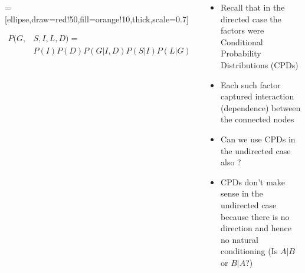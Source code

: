 \begin{frame}
\end{frame}

\begin{frame}
	\begin{columns}
		\begin{overlayarea}{\textwidth}{\textheight}
		\vspace{0.1in}
		\begin{center}
                =[ellipse,draw=red!50,fill=orange!10,thick,scale=0.7]
            \end{center}
         \vspace{0.1in}
        \begin{align*}
        P(G,&S,I,L,D) = \\
        &P(I)P(D)P(G|I,D)P(S|I)P(L|G)
        \end{align*}
		\end{overlayarea}
		\begin{overlayarea}{\textwidth}{\textheight}
			\begin{itemize}\justifying
			\item<1-> Recall that in the directed case the factors were Conditional Probability Distributions (CPDs)
			\item<2-> Each such factor captured interaction (dependence) between the connected nodes
			\item<3-> Can we use CPDs in the undirected case also ?
			\item<4-> CPDs don't make sense in the undirected case because there is no direction and hence no 
			natural conditioning (Is $A|B$ or $B|A$?)
			\end{itemize}
		\end{overlayarea}
	\end{columns}
\end{frame}

